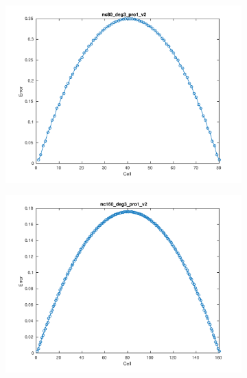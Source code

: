 \documentclass[11pt,a4paper]{article}
\theoremstyle{plain}
\theoremstyle{definition}
\begin{document}
\begin{figure}[H]
\medskip
\begin{subfigure}[b]{0.48\textwidth}
\includegraphics[width=\linewidth]{../../tests_01_01/test_01_01_test9_pro1/output/plots/nc80_deg3_wei111_pro1_v2.pdf}
\end{subfigure}\hspace*{\fill}
\begin{subfigure}[b]{0.48\textwidth}
\includegraphics[width=\linewidth]{../../tests_01_01/test_01_01_test9_pro1/output/plots/nc160_deg3_wei111_pro1_v2.pdf}
\end{subfigure}


\end{figure}
\end{document}
